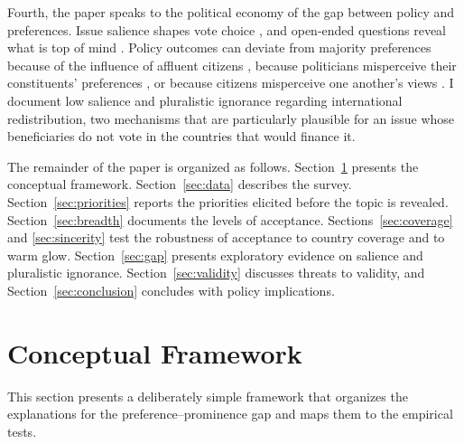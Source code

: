 \documentclass[12pt,english]{article}
\begin{document}
Fourth, the paper speaks to the political economy of the gap between policy and preferences. Issue salience shapes vote choice \citep{repass_issue_1971,krosnick_role_1988,egan_partisan_2013,dennison_review_2019}, and open-ended questions reveal what is top of mind \citep{wlezien_salience_2005,haaland_measuring_2024}. Policy outcomes can deviate from majority preferences because of the influence of affluent citizens \citep{gilens_testing_2014}, because politicians misperceive their constituents' preferences \citep{broockman_bias_2018,pilet_politicians_2024}, or because citizens misperceive one another's views \citep{bursztyn_misperceived_2020,mildenberger_beliefs_2019,andre_globally_2024}. I document low salience and pluralistic ignorance regarding international redistribution, two mechanisms that are particularly plausible for an issue whose beneficiaries do not vote in the countries that would finance it.

The remainder of the paper is organized as follows. Section~\ref{sec:framework} presents the conceptual framework. Section~\ref{sec:data} describes the survey. Section~\ref{sec:priorities} reports the priorities elicited before the topic is revealed. Section~\ref{sec:breadth} documents the levels of acceptance. Sections~\ref{sec:coverage} and \ref{sec:sincerity} test the robustness of acceptance to country coverage and to warm glow. Section~\ref{sec:gap} presents exploratory evidence on salience and pluralistic ignorance. Section~\ref{sec:validity} discusses threats to validity, and Section~\ref{sec:conclusion} concludes with policy implications.

\section{Conceptual Framework}\label{sec:framework}

This section presents a deliberately simple framework that organizes the explanations for the preference--prominence gap and maps them to the empirical tests.
\end{document}
